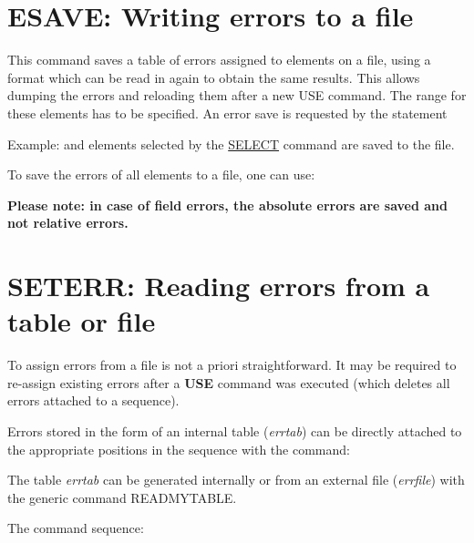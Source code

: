 %

\section{ESAVE: Writing errors to a file}
\label{sec:esave}


This command saves a table of errors assigned to elements on a file,
using a format which can be read in again to obtain the same
results. This allows dumping the errors and reloading them after a new
USE command. The range for these elements has to be specified. An error
save is requested by the statement  

Example: 
and elements selected by the  \href{../Introduction/select.html}{SELECT}
command are saved to the file.  


To save the errors of all elements to a file, one can use: 

{\bf Please note: in case of field errors, the absolute errors are
  saved and not relative errors. } 

\section{SETERR: Reading errors from a table or file}
\label{Sec:seterr}

To assign errors from a file is not a priori straightforward. It may be
required to re-assign existing errors after a \textbf{USE} command was
executed (which deletes all errors attached to a sequence).  

Errors stored in the form of an internal table (\textit{errtab}) can  be
directly attached to the appropriate positions in the sequence with the
command:  


The table \textit{errtab} can be generated internally or from an
external file (\textit{errfile}) with the generic command READMYTABLE.  
 

The command sequence: 

